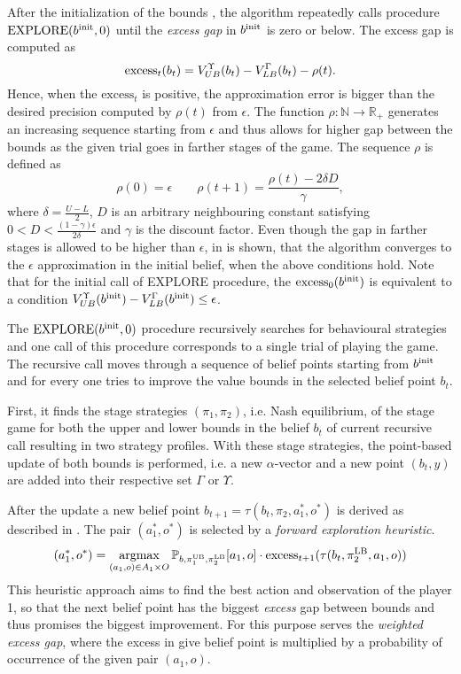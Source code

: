 \documentclass[../main.tex]{subfiles}
\begin{document}
After the initialization of the bounds , the algorithm repeatedly calls procedure $\text{EXPLORE}(b^{\text{init}}, 0)$ until the \textit{excess gap} in $b^{\text{init}}$ is zero or below.
The excess gap is computed as
\begin{equation}
    \text{excess}_t(b_t) = V_{UB}^{\Upsilon}(b_t) - V_{LB}^{\Gamma}(b_t) - \rho(t).
\end{equation}
Hence, when the $\text{excess}_t$ is positive, the approximation error is bigger than the desired precision computed by $\rho(t)$ from $\epsilon$.
The function $\rho: \mathbb{N} \to \mathbb{R}_+$ generates an increasing sequence starting from $\epsilon$ and thus allows for higher gap between the bounds as the given trial goes in farther stages of the game.
The sequence $\rho$ is defined as
\begin{equation}
    \rho(0) = \epsilon \qquad \rho(t+1) = \frac{\rho(t) - 2\delta D}{\gamma},
\end{equation}
where $\delta = \frac{U - L}{2}$, $D$ is an arbitrary neighbouring constant satisfying $0 < D < \frac{(1 - \gamma)\epsilon}{2\delta}$ and $\gamma$ is the discount factor.
Even though the gap in farther stages is allowed to be higher than $\epsilon$, in \cite{poposgsthesis} is shown, that the algorithm converges to the $\epsilon$ approximation in the initial belief, when the above conditions hold.
Note that for the initial call of EXPLORE procedure, the $\text{excess}_0(b^{\text{init}})$ is equivalent to a condition $V_{UB}^{\Upsilon}(b^{\text{init}}) - V_{LB}^{\Gamma}(b^{\text{init}}) \leq \epsilon$.

The $\text{EXPLORE}(b^{\text{init}}, 0)$ procedure recursively searches for behavioural strategies and one call of this procedure corresponds to a single trial of playing the game.
The recursive call moves through a sequence of belief points starting from $b^{\text{init}}$ and for every one tries to improve the value bounds in the selected belief point $b_t$.

First, it finds the stage strategies $(\pi_1, \pi_2)$, i.e. Nash equilibrium, of the stage game  for both the upper and lower bounds in the belief $b_t$ of current recursive call resulting in two strategy profiles.
With these stage strategies, the point-based update of both bounds is performed, i.e. a new $\alpha$-vector and a new point $(b_t, y)$ are added into their respective set $\Gamma$ or $\Upsilon$.

After the update a new belief point $b_{t+1} = \tau(b_t, \pi_2, a_1^*, o^*)$ is derived as described in .
The pair $(a_1^*, o^*)$ is selected by a \textit{forward exploration heuristic}.
\begin{equation}
    (a_1^*, o^*) = \operatorname*{argmax}_{(a_1, o) \in A_1 \times O} \mathbb{P}_{b, \pi_1^{\text{UB}}, \pi_2^{\text{LB}}}[a_1, o] \cdot \text{excess}_{t+1}(\tau(b_t, \pi_2^{\text{LB}}, a_1, o))
\end{equation}
This heuristic approach aims to find the best action and observation of the player 1, so that the next belief point has the biggest \textit{excess} gap between bounds and thus promises the biggest improvement.
For this purpose serves the \textit{weighted excess gap}, where the excess in give belief point is multiplied by a probability of occurrence of the given pair $(a_1, o)$.
\end{document}
